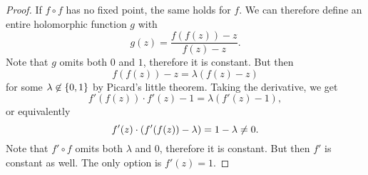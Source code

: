 \begin{proof}
If $f \circ f$ has no fixed point, the same holds for $f$. We can
therefore define an entire holomorphic function $g$ with
\[
g(z) = \frac{f(f(z)) - z}{f(z) - z}.
\]
Note that $g$ omits both $0$ and $1$, therefore it is constant. But
then
\[
f(f(z)) - z = \lambda (f(z) - z)
\]
for some $\lambda \not \in \left\{0, 1\right\}$ by Picard's little theorem.
Taking the derivative, we get
\[
f'(f(z)) \cdot f'(z) - 1 = \lambda (f'(z) - 1),
\]
or equivalently
\[
f'(z) \cdot \left(f'(f(z)) - \lambda\right) = 1 - \lambda \ne 0.
\]
Note that $f' \circ f$ omits both $\lambda$ and $0$, therefore it
is constant. But then $f'$ is constant as well. The only option is
$f'(z) = 1$.
\end{proof}
